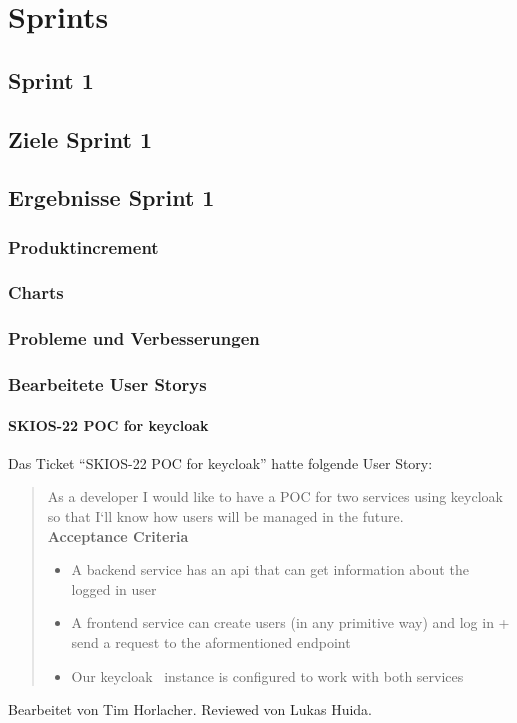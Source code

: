 
\chapter{Sprints} \label{sprints}

\section{Sprint 1}

\section{Ziele Sprint 1}

\section{Ergebnisse Sprint 1}

\subsection{Produktincrement}
\subsection{Charts}

\subsection{Probleme und Verbesserungen}


\subsection{Bearbeitete User Storys}
\subsubsection{SKIOS-22 POC for keycloak}
Das Ticket \enquote{SKIOS-22 POC for keycloak} hatte folgende User Story:
\begin{quotation}
    As a developer I would like to have a POC for two services using keycloak~\parencite{web/Keycloak} so that I`ll know how users will be managed in the future. \\
    \textbf{Acceptance Criteria}
    \begin{itemize}
        \item A backend service has an api that can get information about the logged in user
        \item A frontend service can create users (in any primitive way) and log in + send a request to the aformentioned endpoint
        \item Our keycloak~\parencite{git/skiosa/orm} instance is configured to work with both services
    \end{itemize}
\end{quotation}
Bearbeitet von Tim Horlacher.
Reviewed von Lukas Huida.


